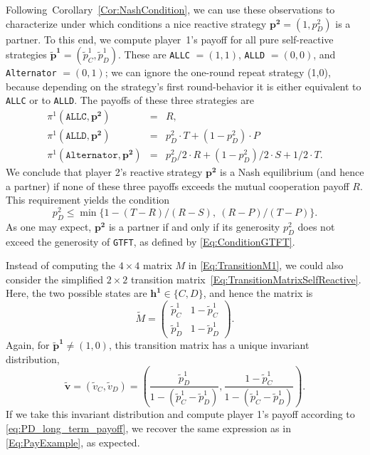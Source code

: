 \documentclass[9pt,twoside,lineno]{pnas-new}
\theoremstyle{plainCl1}
\theoremstyle{plainCl2}
\def\gtft{\texttt{GTFT}}
\def\allc{\texttt{ALLC}}
\def\alld{\texttt{ALLD}}
\def\alt{\texttt{Alternator}}
\begin{document}
Following~Corollary~\ref{Cor:NashCondition}, we can use these observations to characterize under which conditions a nice reactive strategy $\mathbf{p^2}\!=\!(1,p^2_D)$ is a partner. 
To this end, we compute player~1's payoff for all pure self-reactive strategies $\mathbf{\tilde p^1}\!=\!(\tilde p^1_C, \tilde p^1_D)$. 
These are \allc{} $=\! (1,1)$, \alld{} $=\!(0,0)$, and \alt{} $=\!(0,1)$; we can ignore the one-round repeat strategy (1,0), because depending on the strategy's first round-behavior it is either equivalent to \allc{} or to \alld{}. The payoffs of these three strategies are
\begin{equation}
\begin{array}{rcl}
\pi^1(\allc,\mathbf{p^2}) &= &R,\\[0.2cm]
\pi^1(\alld,\mathbf{p^2}) &= &p^2_D \!\cdot \!T +(1\!-\!p^2_D) \!\cdot\!P\\[0.2cm]
\pi^1(\alt,\mathbf{p^2})	&=	& p^2_D/2\!\cdot\!R + (1\!-\!p^2_D)/2\!\cdot\!S + 1/2\!\cdot\! T.
\end{array}
\end{equation}
We conclude that player 2's reactive strategy $\mathbf{p^2}$ is a Nash equilibrium (and hence a partner) if none of these three payoffs exceeds the mutual cooperation payoff $R$. This requirement yields the condition
\begin{equation} \label{Eq:ConditionPartner_n1}
p^2_D \le \min\big\{1\!-\!(T\!-\!R)/(R\!-\!S),~(R\!-\!P)/(T\!-\!P)\big\}.
\end{equation}
As one may expect, $\mathbf{p^2}$ is a partner if and only if its generosity $p^2_D$ does not exceed the generosity of \gtft, as defined by \eqref{Eq:ConditionGTFT}. 

Instead of computing the $4\times4$ matrix $M$ in \eqref{Eq:TransitionM1}, we could also consider the simplified $2\!\times\!2$ transition matrix~\eqref{Eq:TransitionMatrixSelfReactive}. Here, the two possible states are $\mathbf{h^1}\!\in\!\{C,D\}$, and hence the matrix is
\begin{equation}
\tilde{M} = \left(
\begin{array}{cc}
\tilde{p}^1_C	&1\!-\!\tilde p^1_C\\
\tilde p^1_D	&1\!-\!\tilde p^1_D
\end{array}
\right). 
\end{equation}
Again, for $\mathbf{\tilde p^1} \!\neq\! (1,0)$, this transition matrix has a unique invariant distribution,
\begin{equation}
\mathbf{\tilde v} = (\tilde v_C, \tilde v_D) = \left( \frac{\tilde p^1_D}{1-({\tilde p^1_C} - {\tilde p^1_D})}, \frac{1\!-\!\tilde p^1_C}{1-({\tilde p^1_C} - {\tilde p^1_D})} \right).
\end{equation}
If we take this invariant distribution and compute player 1's payoff according to \eqref{eq:PD_long_term_payoff}, we recover the same expression as in \eqref{Eq:PayExample}, as expected.
\end{document}
